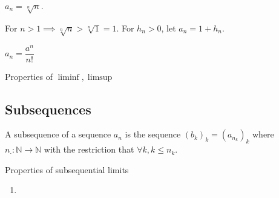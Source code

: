 \begin{example}
    $a_n=\sqrt[n]{n}$.
    
    For $n>1\implies \sqrt[n]{n}>\sqrt[n]{1}=1$. For $h_n>0$, let $a_n=1+h_n.$
\end{example}

\begin{example}
    $a_n=\dfrac{a^n}{n!}$
\end{example}

\begin{example}

\end{example}

\begin{definition}
\end{definition}

\newpage
{}
Properties of $\liminf,\limsup$

\subsection{Subsequences}
\begin{definition}[Subsequence]
    A subsequence of a sequence $a_n$ is the sequence $(b_k)_k=(a_{n_k})_k$ where $n_\cdot:\mathbb{N}\rightarrow\mathbb{N}$ with the restriction that $\forall k, k\leq n_k.$
\end{definition}

\begin{definition}
\end{definition}

Properties of subsequential limits
\begin{enumerate}
    \item 
\end{enumerate}

\begin{lemma}
\end{lemma}

\begin{theorem}
\end{theorem}

\begin{lemma}
\end{lemma}

